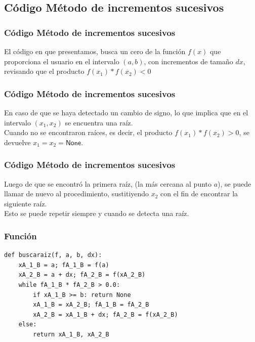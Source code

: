 \subsection{Código Método de incrementos sucesivos}
\begin{frame}
\frametitle{Código Método de incrementos sucesivos}
El código en \python{} que presentamos, busca un cero de la función $f(x)$ que proporciona el usuario en el intervalo $(a, b)$, con incrementos de tamaño $dx$, revisando que el producto $f(x_{1})*f(x_{2}) < 0$
\end{frame}
\begin{frame}
\frametitle{Código Método de incrementos sucesivos}
En caso de que se haya detectado un cambio de signo, lo que implica que en el intervalo $(x_{1}, x_{2})$  se encuentra una raíz.
\\
\bigskip
Cuando no se encontraron raíces, es decir, el producto $f(x_{1})*f(x_{2}) > 0$, se devuelve $x_{1} = x_{2} = \mathsf{None}$.
\end{frame}
\begin{frame}
\frametitle{Código Método de incrementos sucesivos}
Luego de que se encontró la primera raíz, (la más cercana al punto $a$), se puede llamar de nuevo al procedimiento, sustitiyendo $x_{2}$ con el fin de encontrar la siguiente raíz. 
\\
\bigskip
Esto se puede repetir siempre y cuando se detecta una raíz.
\end{frame}
\begin{frame}
\frametitle{Función }
\begin{lstlisting}[caption=Código inicial para buscar los intervalos, style=codigopython]
def buscaraiz(f, a, b, dx):
    xA_1_B = a; fA_1_B = f(a)
    xA_2_B = a + dx; fA_2_B = f(xA_2_B)
    while fA_1_B * fA_2_B > 0.0:
        if xA_1_B >= b: return None
        xA_1_B = xA_2_B; fA_1_B = fA_2_B
        xA_2_B = xA_1_B + dx; fA_2_B = f(xA_2_B)
    else:
        return xA_1_B, xA_2_B
\end{lstlisting}
\end{frame}
